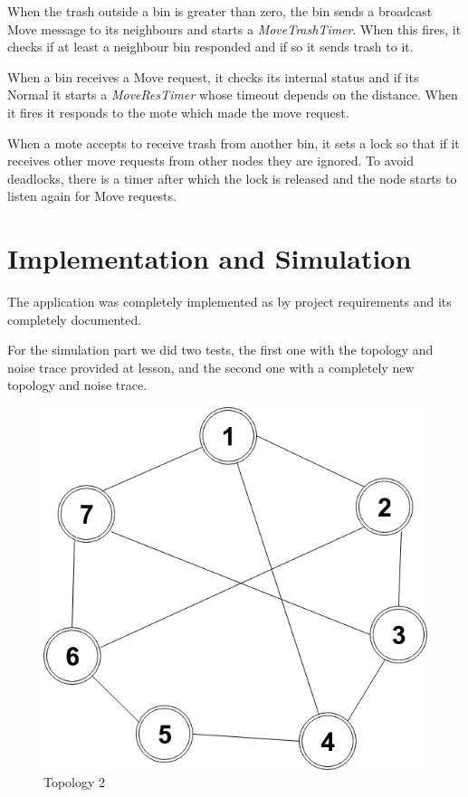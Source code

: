 \documentclass[a4paper,12pt,notitlepage]{report}
\begin{document}
When the trash outside a bin is greater than zero, the bin sends a broadcast Move message to its neighbours and starts a \emph{MoveTrashTimer}. When this fires, it checks if at least a
neighbour bin responded and if so it sends trash to it.

When a bin receives a Move request, it checks its internal status and if its Normal it starts a \emph{MoveResTimer} whose timeout depends on the distance. When it fires it responds to the mote which made the move request.

When a mote accepts to receive trash from another bin, it sets a lock so that if it receives other move requests from other nodes they are ignored. To avoid deadlocks, there is a timer after which the lock is released and the node starts to listen again for Move requests.

\section*{Implementation and Simulation}
The application was completely implemented as by project requirements and its completely documented.

For the simulation part we did two tests, the first one with the topology and noise trace provided at lesson, and the second one with a completely new topology and noise trace.

\begin{figure}[h]
    \centering
    \includegraphics[scale=0.29]{topology.png}
    \caption{Topology 2}
    \label{}
\end{figure}
\end{document}
